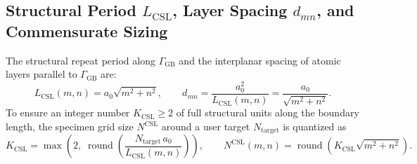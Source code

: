 \documentclass[11pt,a4paper]{article}
\begin{document}
\subsection{Structural Period $L_{\text{CSL}}$, Layer Spacing $d_{mn}$, and Commensurate Sizing}
The structural repeat period along $\Gamma_{\text{GB}}$ and the interplanar spacing of atomic layers parallel to $\Gamma_{\text{GB}}$ are:
\begin{equation}
  L_{\text{CSL}}(m,n) = a_0\sqrt{m^2 + n^2}, \qquad
  d_{mn} = \frac{a_0^2}{L_{\text{CSL}}(m,n)} = \frac{a_0}{\sqrt{m^2 + n^2}}.
\end{equation}
To ensure an integer number $K_{\text{CSL}} \ge 2$ of full structural units along the boundary length, the specimen grid size $N^{\text{CSL}}$ around a user target $N_{\text{target}}$ is quantized as
\begin{equation}
  K_{\text{CSL}} = \max\!\left(2,\; \operatorname{round}\!\left(\frac{N_{\text{target}}\,a_0}{L_{\text{CSL}}(m,n)}\right)\right), \qquad
  N^{\text{CSL}}(m,n) = \operatorname{round}\!\left(K_{\text{CSL}}\sqrt{m^2 + n^2}\right).
\end{equation}
\end{document}
